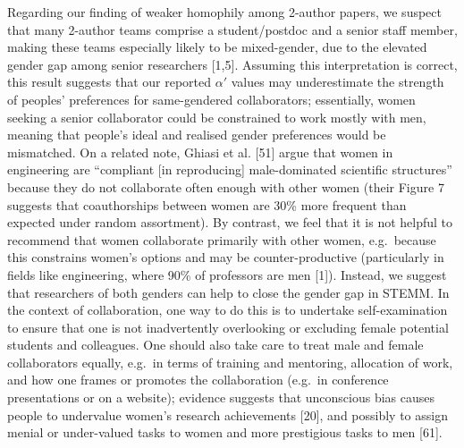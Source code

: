 \documentclass[12pt,]{article}
\begin{document}
Regarding our finding of weaker homophily among 2-author papers, we
suspect that many 2-author teams comprise a student/postdoc and a senior
staff member, making these teams especially likely to be mixed-gender,
due to the elevated gender gap among senior researchers {[}1,5{]}.
Assuming this interpretation is correct, this result suggests that our
reported \(\alpha'\) values may underestimate the strength of peoples'
preferences for same-gendered collaborators; essentially, women seeking
a senior collaborator could be constrained to work mostly with men,
meaning that people's ideal and realised gender preferences would be
mismatched. On a related note, Ghiasi et al. {[}51{]} argue that women
in engineering are ``compliant {[}in reproducing{]} male-dominated
scientific structures'' because they do not collaborate often enough
with other women (their Figure 7 suggests that coauthorships between
women are 30\% more frequent than expected under random assortment). By
contrast, we feel that it is not helpful to recommend that women
collaborate primarily with other women, e.g.~because this constrains
women's options and may be counter-productive (particularly in fields
like engineering, where 90\% of professors are men {[}1{]}). Instead, we
suggest that researchers of both genders can help to close the gender
gap in STEMM. In the context of collaboration, one way to do this is to
undertake self-examination to ensure that one is not inadvertently
overlooking or excluding female potential students and colleagues. One
should also take care to treat male and female collaborators equally,
e.g.~in terms of training and mentoring, allocation of work, and how one
frames or promotes the collaboration (e.g.~in conference presentations
or on a website); evidence suggests that unconscious bias causes people
to undervalue women's research achievements {[}20{]}, and possibly to
assign menial or under-valued tasks to women and more prestigious tasks
to men {[}61{]}.
\end{document}

